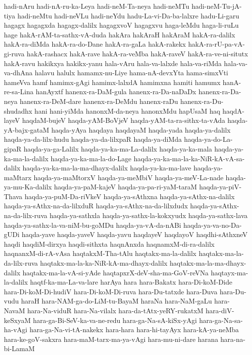 {hadi-nAru
hadi-nA-ru-ka-Leya
hadi-neM-Ta-neya
hadi-neMTu
hadi-neM-Tu-jA-tiya
hadi-neMtu
hadi-neVLu
hadi-neYdu
hadu-La-vi-Da-ba-lalxre
hadu-Li-garu
hagagx
hagagxda
hagagx-dalilx
hagagxvoV
hagagxvu
haga-leMdu
haga-li-ruLu
hage
hakA-rAM-ta-sathx-vA-duda
hakAra
hakAraH
hakAraM
hakA-ra-dalilx
hakA-ra-diMda
hakA-ra-do-Dane
hakA-ra-gaLa
hakA-rakekx
hakA-ra-rU-pa-vA-gi-ruva
hakA-rashacx
hakA-rave
hakA-ra-veMba
hakA-raveV
hakA-ra-ve-ni-situtx
hakA-ravu
hakikxya
hakikx-yanu
hala-vAru
hala-va-lalxde
hala-va-riMda
hala-va-va-dhAna
halavu
halulx
hamamx-nu-Liye
hama-nA-devxYta
hama-simxVti
hameVva
hamf
hamimx-gAgi
hamimx-lalxdA
hamimxna
hamiti
hamumx
hanA-re-sa-Lina
hanAyxtf
hanenx-ra-DaM-gula
hanenx-ra-Da-naDaDx
hanenx-ra-Da-neya
hanenx-ra-DeM-dare
hanenx-ra-DeMdu
hanenx-raDu
hanenx-ra-Du-shudadhx
hani
hani-yiMda
hanonxM-da-neya
hanonxMdu
hapUsaM
haq
haqdA-layeV
haqdaM-bujeV
haqda-yAM-BoVjeV
haqda-yAM-ta-ra-sithx-ta-vAda
haqda-yA-bajx-gataM
haqda-yAya
haqdaya
haqdayaM
haqda-yada
haqda-ya-dalilx
haqda-ya-da-lilx-hudu
haqda-ya-da-lilxpaR
haqda-ya-diMda
haqda-ya-do-La-gipaR
haqda-ya-ga-Lalilx
haqda-ya-ka-ma-La-dalilx
haqda-ya-ka-mala
haqda-ya-ka-ma-la-dalilx
haqda-ya-ka-ma-la-do-Lage
haqda-ya-ka-ma-la-ka-NiR-kA-vA-sa-dalilx
haqda-ya-ka-ma-la-ma-dhayx-dalilx
haqda-ya-ka-ma-lave
haqda-ya-maMtarx
haqda-ya-maMtorxV
haqda-ya-meMbiV
haqda-ya-meV-La-nade
haqda-ya-mu-Ka-dalilx
haqda-ya-paM-kajeV
haqda-ya-pa-ri-yaM-taraM
haqda-ya-piV-Thava
haqda-ya-puM-Da-riVkeV
haqda-ya-sAthxna
haqda-ya-sAthx-na-dalilx
haqda-ya-sAthx-na-da-lilxduR
haqda-ya-sAthx-na-da-lilxdudx
haqda-ya-sAthx-na-da-lilx-ruva
haqda-ya-sathxla
haqda-ya-sathx-la-kokxyudx
haqda-ya-sathx-lava
haqda-ya-sathx-la-va-niM-bu-goMDu
haqda-ya-vA-da-nABi
haqda-ya-va-no-Da-gUDi
haqda-yave
haqda-yaveV
haqda-yavu
haqdayeV
haqdayoV
haqdhi-sAthxneV
haqdi
haqdiM-dirxya
haqdi-sithxta
haqnAnxda
haqnamxM-di-ra-dalilx
haqnanxM-di-rA-vAsa
haqtakxM-Tha-tAlu
haqtakx-ma-la-dalilx
haqtakx-ma-la-da-lilx-ruva
haqtakx-ma-la-ka-NiR-kA-ma-dhayx-dalilx
haqtakx-ma-la-ma-dhayx-dalilx
haqtakx-ma-la-vA-si-yAde
haqtapxrX-deV-sha-ma-GoV-reVNa
haqtayx-ma-la-dalilx
haqtf-ka-ma-La-va-lare
harAya
hara
hara-Bakatx
hara-Di-koM-Dide
hara-Di-koM-Di-hudiV
hara-Di-koM-Di-ruva
hara-Du-tatxde
hara-Duva
hara-Du-vudu
haraH
hara-NAM-ga-do-LiM-tu-BayaM
haraNa
hara-NaM-gaLu
hara-NavaM
hara-Na-viduR
hara-Na-vilalx
hara-da-tAtx-yeRY-rukatxM
hara-diV-keSxyaM
hara-ga-Bi-SeV-ka-va-ne-redu
hara-ga-Na-sA-kiSx-yAgi
hara-ga-Na-sa-ha-vAgi
hara-ga-Na-vi-tA-nakekx
hara-hara
hara-hi-tayAyx
hara-kA-ya-neMba
hara-ke-goV-sakxra
hara-maM-tarx-ma-ya-vAgi
hara-mu-ni-dare
harana
hara-na-bi-LamaM
}
